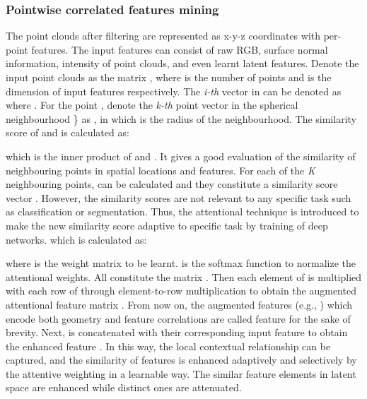 \documentclass[journal]{IEEEtran}
\begin{document}
\subsubsection{Pointwise correlated features mining}

The point clouds after filtering are represented as x-y-z coordinates with per-point features. The input features can consist of raw RGB, surface normal information, intensity of point clouds, and even learnt latent features.
Denote the input point clouds as the matrix , where  is the number of points and  is the dimension of input features respectively. The \textit{i-th} vector in   can be denoted as  where .  For the point ,  denote the \textit{k-th} point vector in the spherical neighbourhood \}\;  as , in which  is the radius of the neighbourhood. The similarity score  of  and  is calculated as:



which is the inner product of  and . It gives a good evaluation of the similarity of neighbouring points in spatial locations and features. For each of the \textit{K} neighbouring points,  can be calculated and they constitute a similarity score vector . However, the similarity scores are not relevant to any specific task such as classification or segmentation. Thus, the attentional technique is introduced to make the new similarity score adaptive to specific task by training of deep networks. which is calculated as:


where  is the weight matrix to be learnt.  is the softmax function to normalize the attentional weights. All  constitute the matrix . 
Then each element of  is multiplied with each row of  through element-to-row multiplication to obtain the augmented attentional feature matrix . From now on, the augmented features (e.g.,   ) which encode both geometry and feature correlations are called feature for the sake of brevity. Next,  is concatenated with their corresponding input feature  to obtain the enhanced feature  . In this way, the local contextual relationship can be captured, and the similarity of features is enhanced adaptively and selectively by the attentive weighting in a learnable way. The similar feature elements in latent space are enhanced while distinct ones are attenuated.
\end{document}
